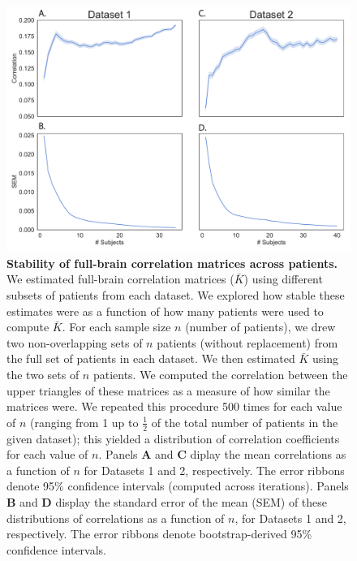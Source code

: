 \documentclass[10pt]{article}
\begin{document}
\begin{figure}[p]
\centering \includegraphics[width=\textwidth]{figs/supplemental_8}
\caption{\textbf{Stability of full-brain correlation matrices across patients.}
We estimated full-brain correlation matrices ($\bar{K}$) using different subsets
of patients from each dataset. We explored how stable these estimates were as a
function of how many patients were used to compute $\bar{K}$. For each sample
size $n$ (number of patients), we drew two non-overlapping sets of $n$ patients
(without replacement) from the full set of patients in each dataset. We then estimated $\bar{K}$ using the two sets of $n$ patients.  We computed the correlation between the upper triangles of these matrices as a measure of how similar the matrices were.  We repeated this procedure 500 times for each value of $n$ (ranging from 1 up to $\frac{1}{2}$ of the total number of patients in the given dataset); this yielded a distribution of correlation coefficients for each value of $n$.  Panels \textbf{A} and \textbf{C} diplay the mean correlations as a function of $n$ for Datasets 1 and 2, respectively.  The error ribbons denote 95\% confidence intervals (computed across iterations).  Panels \textbf{B} and \textbf{D} display
the standard error of the mean (SEM) of these distributions of correlations as a function of $n$, for Datasets 1 and 2, respectively.  The error ribbons
denote bootstrap-derived 95\% confidence intervals.}
\label{fig:supplemental_8}
\end{figure}

\clearpage
\newpage
\renewcommand{\bibnumfmt}[1]{[S#1]}
\renewcommand{\citenumfont}[1]{S#1}


% 
\end{document}
